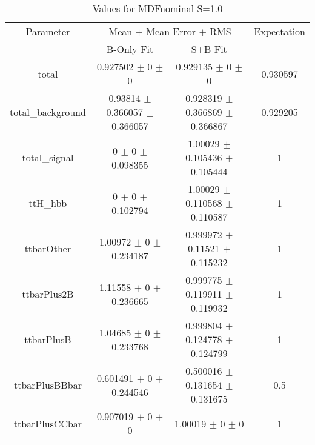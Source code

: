 \begin{table}
\centering
\caption{Values for MDFnominal S=1.0}
\begin{tabular}{cccc}
\toprule
Parameter & \multicolumn{2}{c}{Mean $\pm$ Mean Error $\pm$ RMS} & Expectation\\
 & B-Only Fit & S+B Fit & \\
\midrule
total & \num{0.927502} $\pm$ \num{0} $\pm$ \num{0} & \num{0.929135} $\pm$ \num{0} $\pm$ \num{0} & \num{0.930597}\\
total\_background & \num{0.93814} $\pm$ \num{0.366057} $\pm$ \num{0.366057} & \num{0.928319} $\pm$ \num{0.366869} $\pm$ \num{0.366867} & \num{0.929205}\\
total\_signal & \num{0} $\pm$ \num{0} $\pm$ \num{0.098355} & \num{1.00029} $\pm$ \num{0.105436} $\pm$ \num{0.105444} & \num{1}\\
ttH\_hbb & \num{0} $\pm$ \num{0} $\pm$ \num{0.102794} & \num{1.00029} $\pm$ \num{0.110568} $\pm$ \num{0.110587} & \num{1}\\
ttbarOther & \num{1.00972} $\pm$ \num{0} $\pm$ \num{0.234187} & \num{0.999972} $\pm$ \num{0.11521} $\pm$ \num{0.115232} & \num{1}\\
ttbarPlus2B & \num{1.11558} $\pm$ \num{0} $\pm$ \num{0.236665} & \num{0.999775} $\pm$ \num{0.119911} $\pm$ \num{0.119932} & \num{1}\\
ttbarPlusB & \num{1.04685} $\pm$ \num{0} $\pm$ \num{0.233768} & \num{0.999804} $\pm$ \num{0.124778} $\pm$ \num{0.124799} & \num{1}\\
ttbarPlusBBbar & \num{0.601491} $\pm$ \num{0} $\pm$ \num{0.244546} & \num{0.500016} $\pm$ \num{0.131654} $\pm$ \num{0.131675} & \num{0.5}\\
ttbarPlusCCbar & \num{0.907019} $\pm$ \num{0} $\pm$ \num{0} & \num{1.00019} $\pm$ \num{0} $\pm$ \num{0} & \num{1}\\
\bottomrule
\end{tabular}
\end{table}